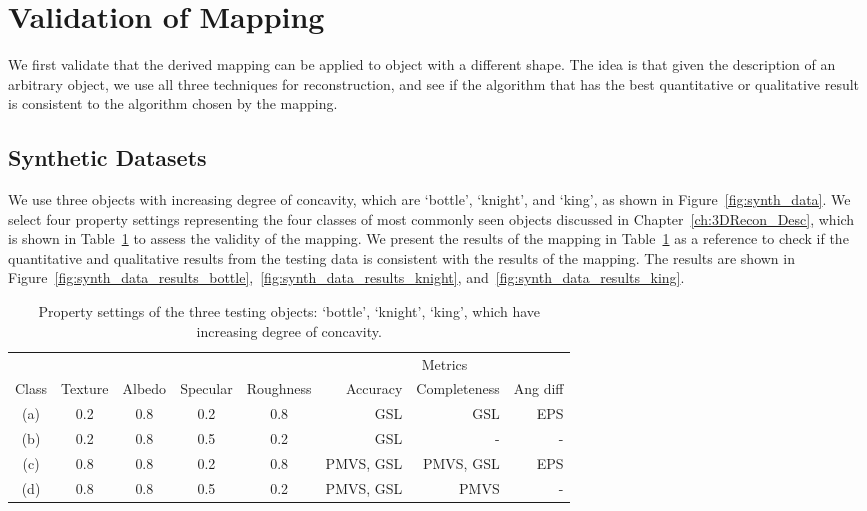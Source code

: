 \section{Validation of Mapping}
\label{sec:interp_extend}
We first validate that the derived mapping can be applied to object with a different shape. The idea is that given the description of an arbitrary object, we use all three techniques for reconstruction, and see if the algorithm that has the best quantitative or qualitative result is consistent to the algorithm chosen by the mapping.

\subsection{Synthetic Datasets}
We use three objects with increasing degree of concavity, which are `bottle', `knight', and `king', as shown in Figure~\ref{fig:synth_data}. We select four property settings representing the four classes of most commonly seen objects discussed in Chapter~\ref{ch:3DRecon_Desc}, which is shown in Table~\ref{tab:prop_list_synth_data} to assess the validity of the mapping. We present the results of the mapping in Table~\ref{tab:prop_list_synth_data} as a reference to check if the quantitative and qualitative results from the testing data is consistent with the results of the mapping. The results are shown in Figure~\ref{fig:synth_data_results_bottle},~\ref{fig:synth_data_results_knight}, and~\ref{fig:synth_data_results_king}.
\begin{table}[!htbp]
  \centering
  \begin{tabular}{*{5}{c}|*{3}{r}}
  \hline
  & & & & & \multicolumn{3}{c}{Metrics}\\
  Class & Texture & Albedo & Specular & Roughness & Accuracy & Completeness & Ang diff\\
  \hline
  (a) & 0.2 & 0.8 & 0.2 & 0.8 & GSL & GSL & EPS\\
  (b) & 0.2 & 0.8 & 0.5 & 0.2 & GSL & - & - \\
  (c) & 0.8 & 0.8 & 0.2 & 0.8 & PMVS, GSL & PMVS, GSL & EPS \\
  (d) & 0.8 & 0.8 & 0.5 & 0.2 & PMVS, GSL & PMVS & -\\
  \hline
  \end{tabular}
  \caption{Property settings of the three testing objects: `bottle', `knight', `king', which have increasing degree of concavity.}
  \label{tab:prop_list_synth_data}
\end{table}

